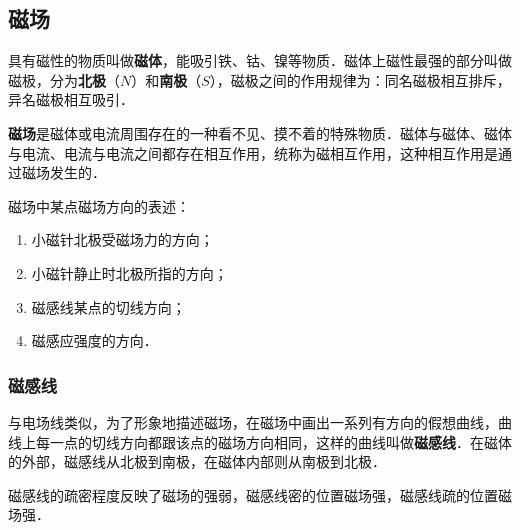 
\begin{issues}
\issueDraft
\issueTODO
\end{issues}
\subsection{磁场}

具有磁性的物质叫做\textbf{磁体}，能吸引铁、钴、镍等物质．磁体上磁性最强的部分叫做磁极，分为\textbf{北极}（$N$）和\textbf{南极}（$S$），磁极之间的作用规律为：同名磁极相互排斥，异名磁极相互吸引．

\textbf{磁场}是磁体或电流周围存在的一种看不见、摸不着的特殊物质．磁体与磁体、磁体与电流、电流与电流之间都存在相互作用，统称为磁相互作用，这种相互作用是通过磁场发生的．

磁场中某点磁场方向的表述：

\begin{enumerate}
\item 小磁针北极受磁场力的方向；
\item 小磁针静止时北极所指的方向；
\item 磁感线某点的切线方向；
\item 磁感应强度的方向．
\end{enumerate}

\subsubsection{磁感线}
与电场线类似，为了形象地描述磁场，在磁场中画出一系列有方向的假想曲线，曲线上每一点的切线方向都跟该点的磁场方向相同，这样的曲线叫做\textbf{磁感线}．在磁体的外部，磁感线从北极到南极，在磁体内部则从南极到北极．

磁感线的疏密程度反映了磁场的强弱，磁感线密的位置磁场强，磁感线疏的位置磁场强．
